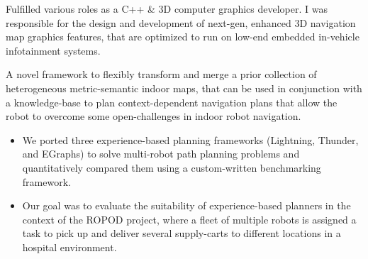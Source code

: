 \documentclass[10pt,a4paper,ragged2e]{altacv}
\begin{document}
\divider

Fulfilled various roles as a C++ \& 3D computer graphics developer. I was responsible for the design and development of next-gen, enhanced 3D navigation map graphics features, that are optimized to run on low-end embedded in-vehicle infotainment systems.



A novel framework to flexibly transform and merge a prior collection of heterogeneous metric-semantic indoor maps, that can be used in conjunction with a knowledge-base to plan context-dependent navigation plans that allow the robot to overcome some open-challenges in indoor robot navigation.


\divider


\begin{itemize}
	\item We ported three experience-based planning frameworks (Lightning, Thunder, and EGraphs) to solve multi-robot path planning problems and quantitatively compared them using a custom-written benchmarking framework. 
	\item Our goal was to evaluate the suitability of experience-based planners in the context of the ROPOD project, where a fleet of multiple robots is assigned a task to pick up and deliver several supply-carts to different locations in a hospital environment.
\end{itemize}

\divider

\end{document}
